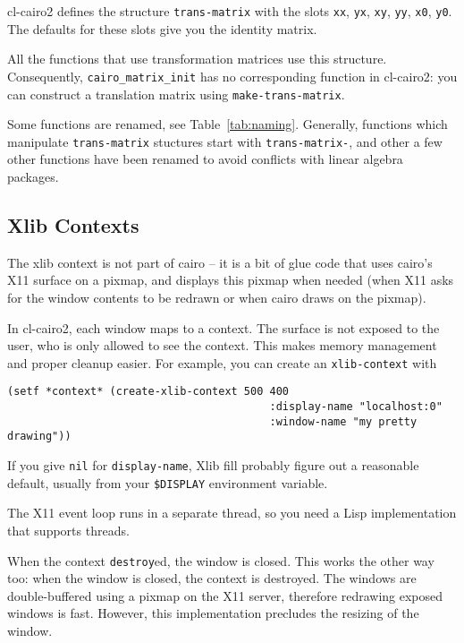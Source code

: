 \documentclass[12pt,letterpaper,dvipdfm]{article}
\begin{document}
cl-cairo2 defines the structure \lstinline!trans-matrix! with the
slots \lstinline!xx!, \lstinline!yx!, \lstinline!xy!, \lstinline!yy!,
\lstinline!x0!, \lstinline!y0!.  The defaults for these slots give you
the identity matrix.

All the functions that use transformation matrices use this structure.
Consequently, \verb!cairo_matrix_init! has no corresponding function
in cl-cairo2: you can construct a translation matrix using
\lstinline!make-trans-matrix!.

Some functions are renamed, see Table~\ref{tab:naming}.  Generally,
functions which manipulate \lstinline!trans-matrix! stuctures start
with \lstinline!trans-matrix-!, and other a few other functions have
been renamed to avoid conflicts with linear algebra packages.

\subsection{Xlib Contexts}
\label{sec:xlib-context}

The xlib context is not part of cairo -- it is a bit of glue code that
uses cairo's X11 surface on a pixmap, and displays this pixmap when
needed (when X11 asks for the window contents to be redrawn or when
cairo draws on the pixmap).

In cl-cairo2, each window maps to a context.  The surface is not
exposed to the user, who is only allowed to see the context.  This
makes memory management and proper cleanup easier.  For example, you
can create an \lstinline!xlib-context! with
\begin{lstlisting}
(setf *context* (create-xlib-context 500 400
                                         :display-name "localhost:0"
                                         :window-name "my pretty drawing"))
\end{lstlisting}
If you give \lstinline!nil! for \lstinline!display-name!, Xlib fill
probably figure out a reasonable default, usually from your
\verb!$DISPLAY! environment variable.

The X11 event loop runs in a separate thread, so you need a Lisp
implementation that supports threads.  

When the context \lstinline!destroy!ed, the window is closed.  This
works the other way too: when the window is closed, the context is
destroyed.  The windows are double-buffered using a pixmap on the X11
server, therefore redrawing exposed windows is fast.  However, this
implementation precludes the resizing of the window.
\end{document}
